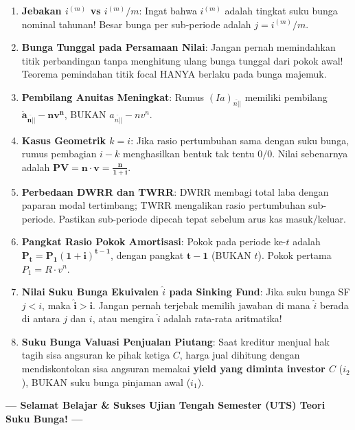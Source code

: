 \documentclass[10pt,a4paper]{article}
\newcommand{\angl}[1]{\overline{#1|}}
\newcommand{\ia}{(Ia)}
\begin{document}
\begin{jebakanbox}
\begin{enumerate}[leftmargin=1.5em, topsep=1pt, itemsep=1pt]
    \item \textbf{Jebakan $i^{(m)}$ vs $i^{(m)}/m$}: Ingat bahwa $i^{(m)}$ adalah tingkat suku bunga nominal tahunan! Besar bunga per sub-periode adalah $j = i^{(m)}/m$.
    \item \textbf{Bunga Tunggal pada Persamaan Nilai}: Jangan pernah memindahkan titik perbandingan tanpa menghitung ulang bunga tunggal dari pokok awal! Teorema pemindahan titik focal HANYA berlaku pada bunga majemuk.
    \item \textbf{Pembilang Anuitas Meningkat}: Rumus $\ia_{\angl{n}|}$ memiliki pembilang $\mathbf{\ddot{a}_{\angl{n}|} - n v^n}$, BUKAN $a_{\angl{n}|} - n v^n$.
    \item \textbf{Kasus Geometrik $k = i$}: Jika rasio pertumbuhan sama dengan suku bunga, rumus pembagian $i - k$ menghasilkan bentuk tak tentu $0/0$. Nilai sebenarnya adalah $\mathbf{PV = n \cdot v = \frac{n}{1+i}}$.
    \item \textbf{Perbedaan DWRR dan TWRR}: DWRR membagi total laba dengan paparan modal tertimbang; TWRR mengalikan rasio pertumbuhan sub-periode. Pastikan sub-periode dipecah tepat sebelum arus kas masuk/keluar.
    \item \textbf{Pangkat Rasio Pokok Amortisasi}: Pokok pada periode ke-$t$ adalah $\mathbf{P_t = P_1 (1+i)^{t-1}}$, dengan pangkat $\mathbf{t-1}$ (BUKAN $t$). Pokok pertama $P_1 = R \cdot v^n$.
    \item \textbf{Nilai Suku Bunga Ekuivalen $\hat{i}$ pada Sinking Fund}: Jika suku bunga SF $j < i$, maka $\mathbf{\hat{i} > i}$. Jangan pernah terjebak memilih jawaban di mana $\hat{i}$ berada di antara $j$ dan $i$, atau mengira $\hat{i}$ adalah rata-rata aritmatika!
    \item \textbf{Suku Bunga Valuasi Penjualan Piutang}: Saat kreditur menjual hak tagih sisa angsuran ke pihak ketiga $C$, harga jual dihitung dengan mendiskontokan sisa angsuran memakai \textbf{yield yang diminta investor $C$} ($i_2$), BUKAN suku bunga pinjaman awal ($i_1$).
\end{enumerate}
\end{jebakanbox}

\vspace{0.3em}
\begin{center}
    \textsf{\textbf{--- Selamat Belajar \& Sukses Ujian Tengah Semester (UTS) Teori Suku Bunga! ---}}
\end{center}
\end{document}

